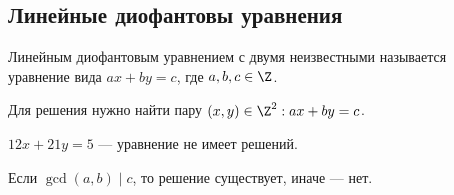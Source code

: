 \subsection{Линейные диофантовы уравнения}

\begin{defn}
    Линейным диофантовым уравнением с двумя неизвестными называется уравнение вида $ax + by = c$, где $a, b, c \in \Z$.
\end{defn}

Для решения нужно найти пару $(x, y) \in \Z^2: ax + by = c$.

\begin{example}
    $12x + 21y = 5$ --- уравнение не имеет решений.
\end{example}

Если $\gcd(a, b) \mid c$, то решение существует, иначе --- нет.

